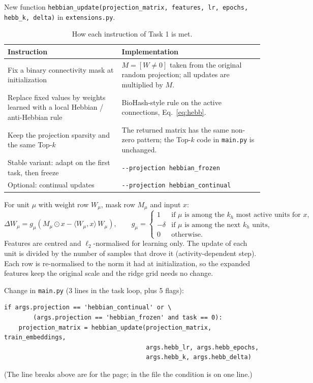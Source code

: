 \documentclass[11pt,a4paper]{article}
\begin{document}
New function \texttt{hebbian\_update(projection\_matrix, features, lr, epochs, hebb\_k, delta)}
in \texttt{extensions.py}.

\begin{table}[h]
\centering
\caption{How each instruction of Task 1 is met.}
\begin{tabularx}{\textwidth}{LL}
\toprule
Instruction & Implementation \\
\midrule
Fix a binary connectivity mask at initialization &
$M = [W \neq 0]$ taken from the original random projection; all updates are multiplied by $M$. \\
Replace fixed values by weights learned with a local Hebbian / anti-Hebbian rule &
BioHash-style rule on the active connections, Eq.~\eqref{eq:hebb}. \\
Keep the projection sparsity and the same Top-$k$ &
The returned matrix has the same non-zero pattern; the Top-$k$ code in \texttt{main.py} is unchanged. \\
Stable variant: adapt on the first task, then freeze & \texttt{-{}-projection hebbian\_frozen} \\
Optional: continual updates & \texttt{-{}-projection hebbian\_continual} \\
\bottomrule
\end{tabularx}
\end{table}

For unit $\mu$ with weight row $W_\mu$, mask row $M_\mu$ and input $x$:
\begin{equation}
\Delta W_\mu = g_\mu \left( M_\mu \odot x - \langle W_\mu, x\rangle\, W_\mu \right),
\qquad
g_\mu =
\begin{cases}
1 & \text{if } \mu \text{ is among the } k_h \text{ most active units for } x,\\
-\delta & \text{if } \mu \text{ is among the next } k_h \text{ units},\\
0 & \text{otherwise.}
\end{cases}
\label{eq:hebb}
\end{equation}
Features are centred and $\ell_2$-normalised for learning only. The update of each unit is divided
by the number of samples that drove it (activity-dependent step). Each row is re-normalised to
the norm it had at initialization, so the expanded features keep the original scale and the ridge
grid needs no change.

Change in \texttt{main.py} (3 lines in the task loop, plus 5 flags):
\begin{verbatim}
if args.projection == 'hebbian_continual' or \
        (args.projection == 'hebbian_frozen' and task == 0):
    projection_matrix = hebbian_update(projection_matrix, train_embeddings,
                                       args.hebb_lr, args.hebb_epochs,
                                       args.hebb_k, args.hebb_delta)
\end{verbatim}
(The line breaks above are for the page; in the file the condition is on one line.)
\end{document}
